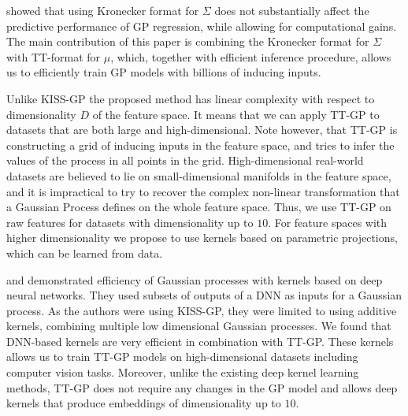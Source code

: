 \citet{nickson2015} showed that using Kronecker
format for $\Sigma$ does not substantially affect the predictive performance
of GP regression, while allowing for computational gains. The main contribution
of this paper is combining the Kronecker format for $\Sigma$ with TT-format
for $\mu$, which, together with efficient inference procedure, allows us to
efficiently train GP models with billions of inducing inputs.

Unlike KISS-GP the proposed method has linear complexity with respect to 
dimensionality $D$ of the feature space. It means that we can apply TT-GP
to datasets that are both large and high-dimensional. Note however, that
TT-GP is constructing a grid of inducing inputs in the feature space, and
tries to infer the values of the process in all points in the grid. 
High-dimensional real-world datasets are believed to lie on small-dimensional
manifolds in the feature space, and it is impractical to try to recover the
complex non-linear transformation that a Gaussian Process defines on the 
whole feature space. Thus, we use TT-GP on raw features for datasets with
dimensionality up to $10$. For feature spaces with higher dimensionality
we propose to use kernels based on parametric projections, which can be learned
from data.
 
\citet{wilson2016deep} and \citet{wilson2016stochastic}
demonstrated efficiency of Gaussian processes with kernels based on deep
neural networks. They used subsets of outputs of a DNN as
inputs for a Gaussian process. As the authors were using KISS-GP, they
were limited to using additive kernels, combining multiple low dimensional 
Gaussian processes. We found that DNN-based kernels are very efficient 
in combination with TT-GP. These kernels allows us to train TT-GP models
on high-dimensional datasets including computer vision tasks. Moreover,
unlike the existing deep kernel learning methods, TT-GP does not require
any changes in the GP model and allows deep kernels that produce embeddings
of dimensionality up to $10$.
